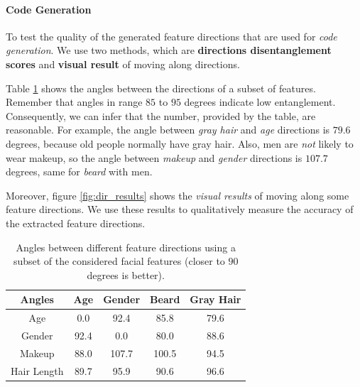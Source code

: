 \paragraph{Code Generation}
To test the quality of the generated feature directions that are used for \emph{code generation}. We use two methods, which are \textbf{directions disentanglement scores} and \textbf{visual result} of moving along directions.

Table \ref{tab:angles} shows the angles between the directions of a subset of features. Remember that angles in range $85$ to $95$ degrees indicate low entanglement. Consequently, we can infer that the number, provided by the table, are reasonable. For example, the angle between \emph{gray hair} and \emph{age} directions is $79.6$ degrees, because old people normally have gray hair. Also, men are \emph{not} likely to wear makeup, so the angle between \emph{makeup} and \emph{gender} directions is $107.7$ degrees, same for \emph{beard} with men.

Moreover, figure \ref{fig:dir_results} shows the \emph{visual results} of moving along some feature directions. We use these results to qualitatively measure the accuracy of the extracted feature directions.

\begin{table}[ht]
\caption{Angles between different feature directions using a subset of the considered facial features (closer to $90$ degrees is better).}
\centering
\begin{tabular}[t]{| c | c | c | c | c |}
\hline
\textbf{Angles} & Age & Gender & Beard & Gray Hair \\
\hline
Age & 0.0 & 92.4 & 85.8 & 79.6 \\
\hline
Gender & 92.4 & 0.0 & 80.0 & 88.6 \\
\hline
Makeup & 88.0 & 107.7 & 100.5 & 94.5 \\
\hline
Hair Length & 89.7 & 95.9 & 90.6 & 96.6 \\
\hline
\end{tabular}

\label{tab:angles}
\end{table}

